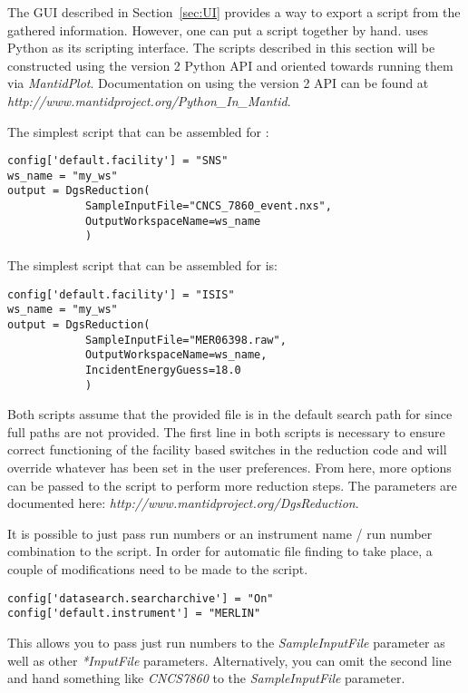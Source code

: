 The GUI described in Section~\ref{sec:UI} provides a way to export a script from the gathered information. However, one can put a script together by hand. \mantid{} uses Python as its scripting interface. The scripts described in this section will be constructed using the version 2 Python API and oriented towards running them via \textit{MantidPlot}. Documentation on using the version 2 API can be found at \textit{http://www.mantidproject.org/Python\_In\_Mantid}.

The simplest script that can be assembled for \sns{}:
\begin{verbatim}
config['default.facility'] = "SNS"
ws_name = "my_ws"
output = DgsReduction(
            SampleInputFile="CNCS_7860_event.nxs",
            OutputWorkspaceName=ws_name
            )
\end{verbatim}
The simplest script that can be assembled for \isis{} is:
\begin{verbatim}
config['default.facility'] = "ISIS"
ws_name = "my_ws"
output = DgsReduction(
            SampleInputFile="MER06398.raw",
            OutputWorkspaceName=ws_name,
            IncidentEnergyGuess=18.0
            )
\end{verbatim}
Both scripts assume that the provided file is in the default search path for \mantid{} since full paths are not provided. The first line in both scripts is necessary to ensure correct functioning of the facility based switches in the reduction code and will override whatever has been set in the \mantid{} user preferences. From here, more options can be passed to the script to perform more reduction steps. The parameters are documented here: \textit{http://www.mantidproject.org/DgsReduction}.

It is possible to just pass run numbers or an instrument name / run number combination to the script. In order for automatic file finding to take place, a couple of modifications need to be made to the script. 
\begin{verbatim}
config['datasearch.searcharchive'] = "On"
config['default.instrument'] = "MERLIN"
\end{verbatim}
This allows you to pass just run numbers to the \textit{SampleInputFile} parameter as well as other \textit{*InputFile} parameters. Alternatively, you can omit the second line and hand something like \textit{CNCS7860} to the \textit{SampleInputFile} parameter.

